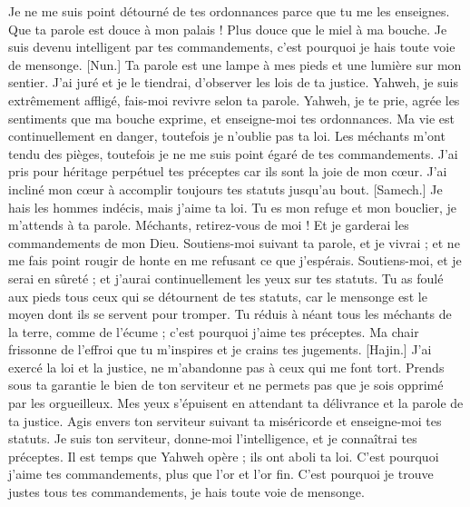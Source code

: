 \begin{multicols}{2}
Je ne me suis point détourné de tes ordonnances parce que tu me les enseignes.
Que ta parole est douce à mon palais ! Plus douce que le miel à ma bouche.
Je suis devenu intelligent par tes commandements, c'est pourquoi je hais toute voie de mensonge.
[Nun.] Ta parole est une lampe à mes pieds et une lumière sur mon sentier.
J'ai juré et je le tiendrai, d'observer les lois de ta justice.
Yahweh, je suis extrêmement affligé, fais-moi revivre selon ta parole.
Yahweh, je te prie, agrée les sentiments que ma bouche exprime, et enseigne-moi tes ordonnances.
Ma vie est continuellement en danger, toutefois je n'oublie pas ta loi.
Les méchants m'ont tendu des pièges, toutefois je ne me suis point égaré de tes commandements.
J'ai pris pour héritage perpétuel tes préceptes car ils sont la joie de mon cœur.
J'ai incliné mon cœur à accomplir toujours tes statuts jusqu’au bout.
[Samech.] Je hais les hommes indécis, mais j'aime ta loi.
Tu es mon refuge et mon bouclier, je m’attends à ta parole.
Méchants, retirez-vous de moi ! Et je garderai les commandements de mon Dieu.
Soutiens-moi suivant ta parole, et je vivrai ; et ne me fais point rougir de honte en me refusant ce que j'espérais.
Soutiens-moi, et je serai en sûreté ; et j'aurai continuellement les yeux sur tes statuts.
Tu as foulé aux pieds tous ceux qui se détournent de tes statuts, car le mensonge est le moyen dont ils se servent pour tromper.
Tu réduis à néant tous les méchants de la terre, comme de l’écume ; c'est pourquoi j'aime tes préceptes.
Ma chair frissonne de l’effroi que tu m’inspires et je crains tes jugements.
[Hajin.] J'ai exercé la loi et la justice, ne m'abandonne pas à ceux qui me font tort.
Prends sous ta garantie le bien de ton serviteur et ne permets pas que je sois opprimé par les orgueilleux.
Mes yeux s’épuisent en attendant ta délivrance et la parole de ta justice.
Agis envers ton serviteur suivant ta miséricorde et enseigne-moi tes statuts.
Je suis ton serviteur, donne-moi l’intelligence, et je connaîtrai tes préceptes.
Il est temps que Yahweh opère ; ils ont aboli ta loi.
C'est pourquoi j'aime tes commandements, plus que l'or et l’or fin.
C'est pourquoi je trouve justes tous tes commandements, je hais toute voie de mensonge.

\end{multicols}
